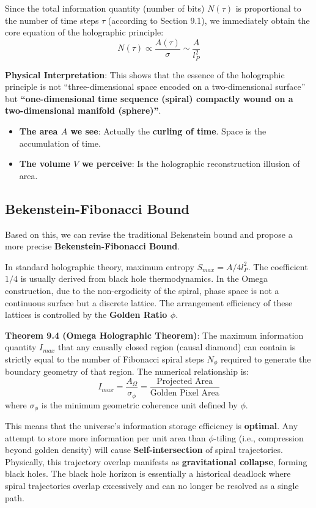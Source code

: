 Since the total information quantity (number of bits) $N(\tau)$ is proportional to the number of time steps $\tau$ (according to Section 9.1), we immediately obtain the core equation of the holographic principle:
\[N(\tau) \propto \frac{A(\tau)}{\sigma} \sim \frac{A}{l_P^2}\]

\textbf{Physical Interpretation}:
This shows that the essence of the holographic principle is not ``three-dimensional space encoded on a two-dimensional surface'' but \textbf{``one-dimensional time sequence (spiral) compactly wound on a two-dimensional manifold (sphere)''}.

\begin{itemize}
\item \textbf{The area $A$ we see}: Actually the \textbf{curling of time}. Space is the accumulation of time.
\item \textbf{The volume $V$ we perceive}: Is the holographic reconstruction illusion of area.
\end{itemize}

\subsection{Bekenstein-Fibonacci Bound}

Based on this, we can revise the traditional Bekenstein bound and propose a more precise \textbf{Bekenstein-Fibonacci Bound}.

In standard holographic theory, maximum entropy $S_{max} = A / 4l_P^2$. The coefficient $1/4$ is usually derived from black hole thermodynamics.
In the Omega construction, due to the non-ergodicity of the spiral, phase space is not a continuous surface but a discrete lattice. The arrangement efficiency of these lattices is controlled by the \textbf{Golden Ratio $\phi$}.

\textbf{Theorem 9.4 (Omega Holographic Theorem)}:
The maximum information quantity $I_{max}$ that any causally closed region (causal diamond) can contain is strictly equal to the number of Fibonacci spiral steps $N_{\phi}$ required to generate the boundary geometry of that region.
The numerical relationship is:
\[I_{max} = \frac{A_{\Omega}}{\sigma_{\phi}} = \frac{\text{Projected Area}}{\text{Golden Pixel Area}}\]
where $\sigma_{\phi}$ is the minimum geometric coherence unit defined by $\phi$.

This means that the universe's information storage efficiency is \textbf{optimal}. Any attempt to store more information per unit area than $\phi$-tiling (i.e., compression beyond golden density) will cause \textbf{Self-intersection} of spiral trajectories. Physically, this trajectory overlap manifests as \textbf{gravitational collapse}, forming black holes. The black hole horizon is essentially a historical deadlock where spiral trajectories overlap excessively and can no longer be resolved as a single path.

